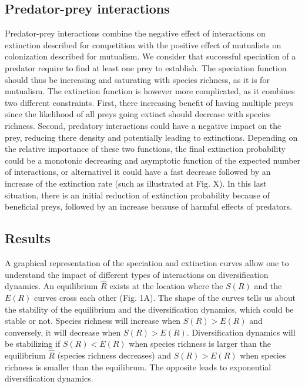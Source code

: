 \documentclass[12pt]{article}
\begin{document}
\subsection*{Predator-prey interactions}

Predator-prey interactions combine the negative effect of interactions on
extinction described for competition with the positive effect of mutualists on
colonization described for mutualism. We consider that successful speciation
of a predator require to find at least one prey to establish. The speciation
function should thus be increasing and saturating with species richness, as it
is for mutualism. The extinction function is however more complicated, as it
combines two different constraints. First, there increasing benefit of having
multiple preys since the likelihood of all preys going extinct should decrease
with species richness. Second, predatory interactions could have a negative
impact on the prey, reducing there density and potentially leading to
extinctions. Depending on the relative importance of these two functions, the
final extinction probability could be a monotonic decreasing and asymptotic
function of the expected number of interactions, or alternativel it could have
a fast decrease followed by an increase of the extinction rate (such as
illustrated at Fig. X). In this last situation, there is an initial reduction
of extinction probability because of beneficial preys, followed by an increase
because of harmful effects of predators.

\subsection*{Results} 

A graphical representation of the speciation and extinction curves allow one
to understand the impact of different types of interactions on diversification
dynamics. An equilibrium $\hat{R}$ exists at the location where the $S(R)$ and
the $E(R)$ curves cross each other (Fig. 1A). The shape of the curves tells us
about the stability of the equilibrium and the diversification dynamics, which
could be stable or not. Species richness will increase when $S(R) > E(R)$ and
conversely, it will decrease when $S(R) > E(R)$. Diversification dynamics will
be stabilizing if $S(R) < E(R)$ when species richness is larger than the
equilibrium $\hat{R}$ (species richness decreases) and $S(R) > E(R)$ when
species richness is smaller than the equilibrum. The opposite leads to
exponential diversification dynamics.
\end{document}
